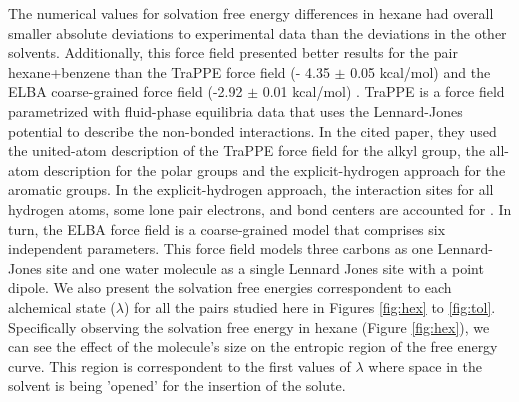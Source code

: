 The numerical values for solvation free energy differences in hexane had overall smaller absolute deviations to experimental data than the deviations in the other solvents. Additionally, this force field presented better results for the pair hexane+benzene than the TraPPE force field (- 4.35  $\pm$ 0.05 kcal/mol) \cite{garrido2011} and the ELBA coarse-grained force field  (-2.92 $\pm$ 0.01 kcal/mol) \cite{doi:10.1021/acs.jctc.5b00963}. TraPPE is a force field parametrized with fluid-phase equilibria data that uses the Lennard-Jones potential to describe the non-bonded interactions. In the cited paper, they used the united-atom description of the TraPPE force field for the alkyl group, the all-atom description for the polar groups and the explicit-hydrogen approach for the aromatic groups. In the explicit-hydrogen approach, the interaction sites for all hydrogen atoms, some lone pair electrons, and bond centers are accounted for \cite{doi:10.1021/jp073586l}. In turn, the ELBA force field is a coarse-grained model that comprises six independent parameters. This force field models three carbons as one Lennard-Jones site and one water molecule as a single Lennard Jones site with a point dipole. We also present the solvation free energies correspondent to each alchemical state ($\lambda$) for all the pairs studied here in Figures \ref{fig:hex} to \ref{fig:tol}. Specifically observing the solvation free energy in hexane (Figure \ref{fig:hex}), we can see the effect of the molecule's size on the entropic region of the free energy curve. This region is correspondent to the first values of $\lambda$ where space in the solvent is being 'opened' for the insertion of the solute.

